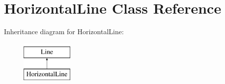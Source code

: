 \hypertarget{classHorizontalLine}{\section{\-Horizontal\-Line \-Class \-Reference}
\label{classHorizontalLine}
}
\-Inheritance diagram for \-Horizontal\-Line\-:\begin{figure}[H]
\begin{center}
\leavevmode
\includegraphics[height=2.000000cm]{classHorizontalLine}
\end{center}
\end{figure}
